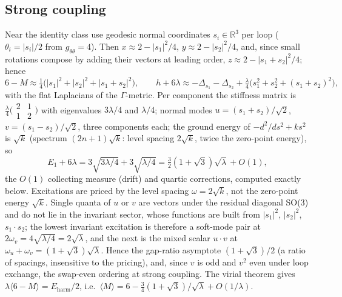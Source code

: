 \documentclass[11pt]{article}
\theoremstyle{definition}
\theoremstyle{remark}
\begin{document}
\subsection{Strong coupling}\label{app:strong}
Near the identity class use geodesic normal coordinates $s_i \in
\mathbb R^3$ per loop ($\theta_i = |s_i|/2$ from $g_{\theta\theta} =
4$).  Then $x \approx 2 - |s_1|^2/4$, $y \approx 2 - |s_2|^2/4$, and,
since small rotations compose by adding their vectors at leading order,
$z \approx 2 - |s_1 + s_2|^2/4$; hence
\[
6 - M \approx \tfrac14\big(|s_1|^2 + |s_2|^2 + |s_1 + s_2|^2\big),
\qquad
h + 6\lambda \approx -\Delta_{s_1} - \Delta_{s_2} + \tfrac{\lambda}{4}
\big(s_1^2 + s_2^2 + (s_1{+}s_2)^2\big),
\]
with the flat Laplacians of the $\Gamma$-metric.  Per component the
stiffness matrix is $\tfrac{\lambda}{4}
\big(\begin{smallmatrix}2&1\\1&2\end{smallmatrix}\big)$ with
eigenvalues $3\lambda/4$ and $\lambda/4$; normal modes $u = (s_1 +
s_2)/\sqrt2$, $v = (s_1 - s_2)/\sqrt2$, three components each; the
ground energy of $-d^2/ds^2 + k s^2$ is $\sqrt k$ (spectrum
$(2n{+}1)\sqrt k$: level spacing $2\sqrt k$, twice the zero-point
energy), so
\[
E_1 + 6\lambda = 3\sqrt{3\lambda/4} + 3\sqrt{\lambda/4} =
\tfrac32(1 + \sqrt3)\sqrt{\lambda} + O(1),
\]
the $O(1)$ collecting measure (drift) and quartic corrections,
computed exactly below.  Excitations are
priced by the level spacing $\omega = 2\sqrt k$, not the zero-point
energy $\sqrt k$.  Single quanta of $u$ or $v$ are vectors under the
residual diagonal SO(3) and do not lie in the invariant sector, whose
functions are built from $|s_1|^2$, $|s_2|^2$, $s_1 \cdot s_2$; the
lowest invariant excitation is therefore a soft-mode pair at
$2\omega_v = 4\sqrt{\lambda/4} = 2\sqrt\lambda$, and the next is the
mixed scalar $u \cdot v$ at $\omega_u + \omega_v =
(1 + \sqrt3)\sqrt\lambda$.  Hence the gap-ratio asymptote
$(1 + \sqrt3)/2$ (a ratio of spacings, insensitive to the pricing),
and, since $v$ is odd and $v^2$ even under loop
exchange, the swap-even ordering at strong coupling.  The virial
theorem gives $\lambda\langle 6 - M\rangle = E_{\mathrm{harm}}/2$,
i.e.\ $\langle M\rangle = 6 - \tfrac34(1 + \sqrt3)/\sqrt\lambda +
O(1/\lambda)$.
\end{document}
